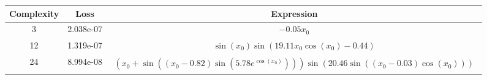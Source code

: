 \begin{center}
        \begin{tabular}{|c|c|c|}
        \hline
        Complexity & Loss & Expression \\
        \hline
        3 & 2.038e-07 & $\begin{aligned}- 0.05 x_{0}\end{aligned}$\\ \hline12 & 1.319e-07 & $\begin{aligned}\sin{\left(x_{0} \right)} \sin{\left(19.11 x_{0} \cos{\left(x_{0} \right)} - 0.44 \right)}\end{aligned}$\\ \hline24 & 8.994e-08 & $\begin{aligned}\left(x_{0} + \sin{\left(\left(x_{0} - 0.82\right) \sin{\left(5.78 e^{\cos{\left(x_{0} \right)}} \right)} \right)}\right) \sin{\left(20.46 \sin{\left(\left(x_{0} - 0.03\right) \cos{\left(x_{0} \right)} \right)} \right)}\end{aligned}$\\ \hline\end{tabular}
        \end{center}
        